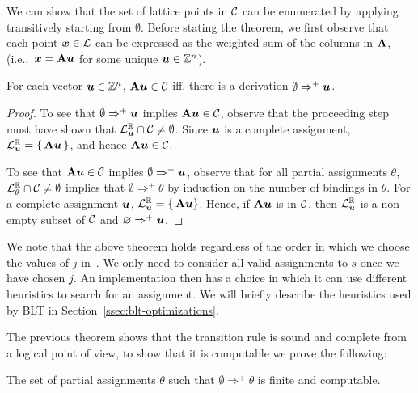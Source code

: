 We can show that the set of lattice points in $\mathcal{C}$ can be enumerated by
applying~ transitively starting
from $\emptyset$.
%
Before stating the theorem, we first observe that each point $\boldsymbol{x} \in \mathcal{L}$
can be expressed as the weighted sum of the columns in $\mathbf{A}$,
(i.e.,~$\boldsymbol{x} = \mathbf{A}\boldsymbol{u}$ for some unique $\boldsymbol{u} \in \mathbb{Z}^n$).
%
\begin{thm}
  For each vector $\boldsymbol{u} \in \mathbb{Z}^n$, $\mathbf{A} \boldsymbol{u} \in \mathcal{C}$ iff. there is
  a derivation $\emptyset \Rightarrow^{+} \boldsymbol{u}$.
\end{thm}
\begin{proof}
%
To see that $\emptyset \Rightarrow^{+} \boldsymbol{u}$ implies $\mathbf{A} \boldsymbol{u} \in \mathcal{C}$,
observe that the proceeding step must have shown that
$\mathcal{L}^{\mathbb{R}}_{\boldsymbol{u}} \cap \mathcal{C} \neq \emptyset$.  Since $\boldsymbol{u}$
is a complete assignment, $\mathcal{L}^{\mathbb{R}}_{\boldsymbol{u}} = \{\,\mathbf{A} \boldsymbol{u}\,\}$, and
hence $\mathbf{A} \boldsymbol{u} \in \mathcal{C}$.

To see that $\mathbf{A} \boldsymbol{u} \in \mathcal{C}$ implies $\emptyset \Rightarrow^{+} \boldsymbol{u}$,
observe that for all
partial assignments $\theta$, $\mathcal{L}^{\mathbb{R}}_\theta \cap \mathcal{C} \neq \emptyset$
implies that $\emptyset \Rightarrow^{+} \theta$
by induction on the number of bindings in $\theta$.
%
For a complete assignment $\boldsymbol{u}$, $\mathcal{L}^{\mathbb{R}}_{\boldsymbol{u}} = \{\,\mathbf{A} \boldsymbol{u}\}$.
Hence, if $\mathbf{A} \boldsymbol{u}$ is in $\mathcal{C}$, then
$\mathcal{L}^{\mathbb{R}}_{\boldsymbol{u}}$ is a non-empty subset of $\mathcal{C}$ and $\varnothing \Rightarrow^{+} \boldsymbol{u}$.
\end{proof}
%
We note that the above theorem holds regardless of the order in which we choose
the values of $j$ in~.  We only need to consider all valid
assignments to $s$ once we have chosen $j$.  An implementation then has
a choice in which it can use different heuristics to search for an
assignment.
%
We will briefly describe
the heuristics used by BLT in Section~\ref{ssec:blt-optimizations}.

The previous theorem shows that the transition rule is sound and complete from
a logical point of view, to show that it is computable
we prove the following:

\begin{thm}
  The set of partial assignments $\theta$ such that
  $\emptyset \Rightarrow^{+} \theta$ is finite and
  computable.
  \label{thm:computable}
\end{thm}

